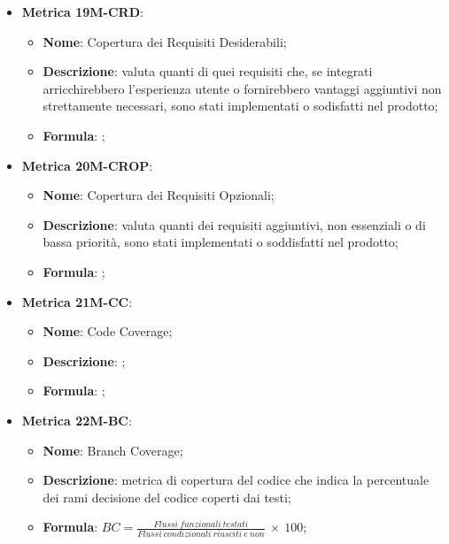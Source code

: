 \begin{itemize}
    \item \textbf{Metrica 19M-CRD}:
    \begin{itemize}
        \item \textbf{Nome}: Copertura dei Requisiti Desiderabili;
        \item \textbf{Descrizione}: valuta quanti di quei requisiti che, se integrati arricchirebbero l'esperienza utente o fornirebbero vantaggi aggiuntivi non strettamente necessari, sono stati implementati o sodisfatti nel prodotto;
        \item \textbf{Formula}: ;
    \end{itemize}
\end{itemize}

\begin{itemize}
    \item \textbf{Metrica 20M-CROP}:
    \begin{itemize}
        \item \textbf{Nome}: Copertura dei Requisiti Opzionali;
        \item \textbf{Descrizione}: valuta quanti dei requisiti aggiuntivi, non essenziali o di bassa priorità, sono stati implementati o soddisfatti nel prodotto;
        \item \textbf{Formula}: ;
    \end{itemize}
\end{itemize}

\begin{itemize}
    \item \textbf{Metrica 21M-CC}:
    \begin{itemize}
        \item \textbf{Nome}: Code Coverage;
        \item \textbf{Descrizione}: ;
        \item \textbf{Formula}: ;
    \end{itemize}
\end{itemize}

\begin{itemize}
    \item \textbf{Metrica 22M-BC}:
    \begin{itemize}
        \item \textbf{Nome}: Branch Coverage;
        \item \textbf{Descrizione}: metrica di copertura del codice che indica la percentuale dei rami decisione del codice coperti dai testi;
        \item \textbf{Formula}: $BC =\frac{Flussi\:funzionali\: testati}{Flussi\:condizionali\: riusciti\: e\: non}\: \times \: 100$;
    \end{itemize}
\end{itemize}

